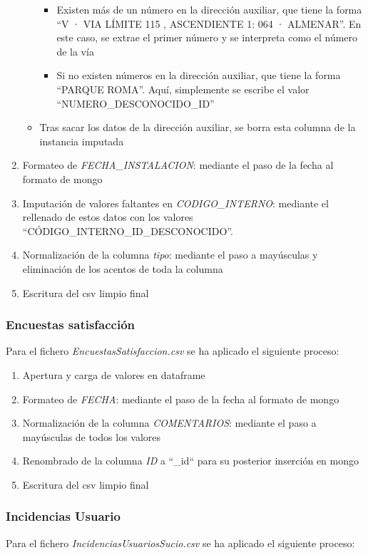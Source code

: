 \documentclass[]{article}
\begin{document}
\begin{enumerate}
\begin{itemize}
\begin{itemize}
            \item Existen más de un número en la dirección auxiliar, que tiene la forma ``V · VIA LÍMITE 115 , ASCENDIENTE 1: 064 · ALMENAR''. En este caso, se extrae el primer número y se interpreta como el número de la vía
            \item Si no existen números en la dirección auxiliar, que tiene la forma ``PARQUE ROMA''. Aquí, simplemente se escribe el valor ``NUMERO\_DESCONOCIDO\_ID''
        \end{itemize}
        \item Tras sacar los datos de la dirección auxiliar, se borra esta columna de la instancia imputada
    \end{itemize}
    \item Formateo de \textit{FECHA\_INSTALACION}: mediante el paso de la fecha al formato de mongo
    \item Imputación de valores faltantes en \textit{CODIGO\_INTERNO}: mediante el rellenado de estos datos con los valores ``CÓDIGO\_INTERNO\_ID\_DESCONOCIDO''.
    \item Normalización de la columna \textit{tipo}: mediante el paso a mayúsculas y eliminación de los acentos de toda la columna
    \item Escritura del csv limpio final
\end{enumerate}

\subsubsection{Encuestas satisfacción}
\label{subsubsec:preprocesssatisfaccion}
Para el fichero \textit{EncuestasSatisfaccion.csv} se ha aplicado el siguiente proceso:

\begin{enumerate}
    \item Apertura y carga de valores en dataframe
    \item Formateo de \textit{FECHA}: mediante el paso de la fecha al formato de mongo
    \item Normalización de la columna \textit{COMENTARIOS}: mediante el paso a mayúsculas de todos los valores
    \item Renombrado de la columna \textit{ID} a ``\_id`` para su posterior inserción en mongo
    \item Escritura del csv limpio final
\end{enumerate}

\subsubsection{Incidencias Usuario}
\label{subsubsec:preprocessincidenciasusuario}
Para el fichero \textit{IncidenciasUsuariosSucio.csv} se ha aplicado el siguiente proceso:
\end{document}
